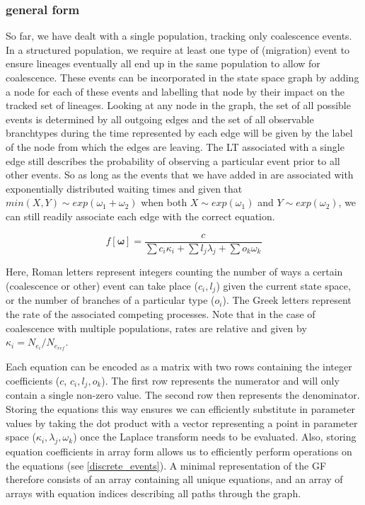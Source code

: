 \documentclass[10pt, a4]{article}
\begin{document}
\subsubsection{general form}
So far, we have dealt with a single population, tracking only coalescence events. In a structured population, we require at least one type of (migration) event to ensure lineages eventually all end up in the same population to allow for coalescence. These events can be incorporated in the state space graph by adding a node for each of these events and labelling that node by their impact on the tracked set of lineages. Looking at any node in the graph, the set of all possible events is determined by all outgoing edges and the set of all observable branchtypes during the time represented by each edge will be given by the label of the node from which the edges are leaving. The LT associated with a single edge still describes the probability of observing a particular event prior to all other events. So as long as the events that we have added in are associated with exponentially distributed waiting times and given that $min(X, Y) \sim exp(\omega_1+\omega_2)$ when both $X \sim exp(\omega_1)$ and $Y \sim exp(\omega_2)$, we can still readily associate each edge with the correct equation.

\begin{equation} \label{eq:general_form}
f[\boldsymbol{\omega}] = \frac{c}{\sum c_i\kappa_i + \sum l_j\lambda_j + \sum o_k \omega_k} 
\end{equation}

Here, Roman letters represent integers counting the number of ways a certain (coalescence or other) event can take place ($c_i, l_j$) given the current state space, or the number of branches of a particular type ($o_i$). The Greek letters represent the rate of the associated competing processes. Note that in the case of coalescence with multiple populations, rates are relative and given by $\kappa_i = N_{e_{i}}/N_{e_{ref}}$.

Each equation can be encoded as a matrix with two rows containing the integer coefficients ($c$, $c_i, l_j, o_k$). The first row represents the numerator and will only contain a single non-zero value. The second row then represents the denominator. Storing the equations this way ensures we can efficiently substitute in parameter values by taking the dot product with a vector representing a point in parameter space ($\kappa_i, \lambda_j, \omega_k$) once the Laplace transform needs to be evaluated. Also, storing equation coefficients in array form allows us to efficiently perform operations on the equations (see \ref{discrete_events}). A minimal representation of the GF therefore consists of an array containing all unique equations, and an array of arrays with equation indices describing all paths through the graph. 
\end{document}
